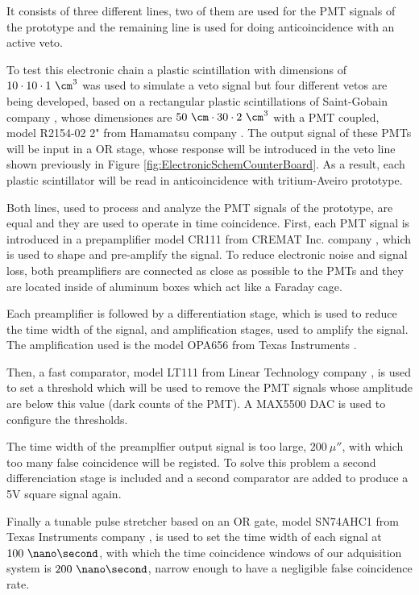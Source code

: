 \begin{enumerate}
It consists of three different lines, two of them are used for the PMT signals of the prototype and the remaining line is used for doing anticoincidence with an active veto.

To test this electronic chain a plastic scintillation with dimensions of $10 \cdot{} 10 \cdot{} 1~\cm^3$ was used to simulate a veto signal but four different vetos are being developed, based on a rectangular plastic scintillations of Saint-Gobain company \cite{VetoAveiro}, whose dimensiones are $50~\cm \cdot{} 30 \cdot{} 2~\cm^3$  with a PMT coupled, model R2154-02 2" from Hamamatsu company \cite{DataSheetPMTsAveiro}. The output signal of these PMTs will be input in a OR stage, whose response will be introduced in the veto line shown previously in Figure \ref{fig:ElectronicSchemCounterBoard}. As a result, each plastic scintillator will be read in anticoincidence with tritium-Aveiro prototype.

Both lines, used to process and analyze the PMT signals of the prototype, are equal and they are used to operate in time coincidence. First, each PMT signal is introduced in a prepamplifier model CR111 from CREMAT Inc. company \cite{CREMATPreAmplifierDataSheet}, which is used to shape and pre-amplify the signal. To reduce electronic noise and signal loss, both preamplifiers are connected as close as possible to the PMTs and they are located inside of aluminum boxes which act like a Faraday cage.

Each preamplifier is followed by a differentiation stage, which is used to reduce the time width of the signal, and amplification stages, used to amplify the signal. The amplification used is the model OPA656 from Texas Instruments \cite{OPA656}. 

Then, a fast comparator, model LT111 from Linear Technology company \cite{LT111}, is used to set a threshold which will be used to remove the PMT signals whose amplitude are below this value (dark counts of the PMT). A MAX5500 DAC is used to configure the thresholds.

The time width of the preamplfier output signal is too large, $200~\mu\second$, with which too many false coincidence will be registed. To solve this problem a second differenciation stage is included and a second comparator are added to produce a 5V square signal again.

Finally a tunable pulse stretcher based on an OR gate, model SN74AHC1 from Texas Instruments company \cite{Stretcher}, is used to set the time width of each signal at $100~\nano\second$, with which the time coincidence windows of our adquisition system is $200~\nano\second$, narrow enough to have a negligible false coincidence rate.


\end{enumerate}
